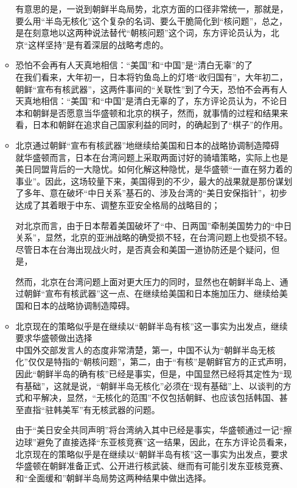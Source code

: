 \documentclass[a4paper,11pt]{article}
\begin{document}
\begin{itemize}
\begin{itemize}
    有意思的是，一说到朝鲜半岛局势，北京方面的口径非常统一，那就是，要么用“半岛无核化”这个复杂的名词、要么干脆简化到“核问题”，总之，是在刻意地以这两种说法替代“朝核问题”这个词，东方评论员认为，北京“这样坚持”是有着深层的战略考虑的。
 

\item 恐怕不会再有人天真地相信：“美国”和“中国”是“清白无辜”的了\\
\label{sec-1_3_5}%
在我们看来，大年初一，日本将钓鱼岛上的灯塔“收归国有”，大年初二，朝鲜“宣布有核武器”，这两件事间的“关联性”到了今天，恐怕不会再有人天真地相信：“美国”和“中国”是清白无辜的了，东方评论员认为，不论日本和朝鲜是否愿意当华盛顿和北京的棋子，然而，就事情的过程和结果来看，日本和朝鲜在追求自己国家利益的同时，的确起到了“棋子”的作用。
 

\item 北京通过朝鲜“宣布有核武器”地继续给美国和日本的战略协调制造障碍\\
\label{sec-1_3_6}%
就华盛顿而言，日本在台湾问题上采取两面讨好的骑墙策略，实际上也是美日同盟背后的一大隐忧。如何化解这种隐忧，是华盛顿“一直在努力着的事业”。因此，这场较量下来，美国得到的不少，最大的战果就是那份谋划了多年、意在破坏“中日关系”基石的、涉及台湾的“美日安保指针”，初步达成了其着眼于中东、调整东亚安全格局的战略目的；

    对北京而言，由于日本帮着美国破坏了“中、日两国”牵制美国势力的“中日关系”，显然，北京的亚洲战略的确受损不轻，在台湾问题上也受损不轻。尽管日本在台海出现战火时，是否真会和美国一道协防还是个疑问，但是，

    然而，北京在台湾问题上面对更大压力的同时，显然也在朝鲜半岛上、通过朝鲜“宣布有核武器”这一点、在继续给美国和日本施加压力、继续给美国和日本的战略协调制造障碍。
 

\item 北京现在的策略似乎是在继续以“朝鲜半岛有核”这一事实为出发点，继续要求华盛顿做出选择\\
\label{sec-1_3_7}%
中国外交部发言人的态度非常清楚，第一，中国不认为“朝鲜半岛无核化”仅仅是特指的“朝核问题”，第二，由于“有核”是朝鲜官方的正式声明，因此“朝鲜半岛的确有核”已经是事实，但是，中国显然已经将其定性为“现有基础”，这就是说，“朝鲜半岛无核化”必须在“现有基础”上、以谈判的方式和平解决，显然，“无核化的范围”不仅包括朝鲜、也应该包括韩国、甚至直指“驻韩美军”有无核武器的问题。

    由于“美日安全共同声明”将台湾纳入其中已经是事实，华盛顿通过一记“擦边球”避免了直接选择“东亚核竞赛”这一结果，因此，在东方评论员看来，北京现在的策略似乎是在继续以“朝鲜半岛有核”这一事实为出发点，要求华盛顿在朝鲜准备正式、公开进行核武装、继而有可能引发东亚核竞赛、和“全面缓和”朝鲜半岛局势这两种结果中做出选择。


\end{itemize}
\end{itemize}
\end{document}
